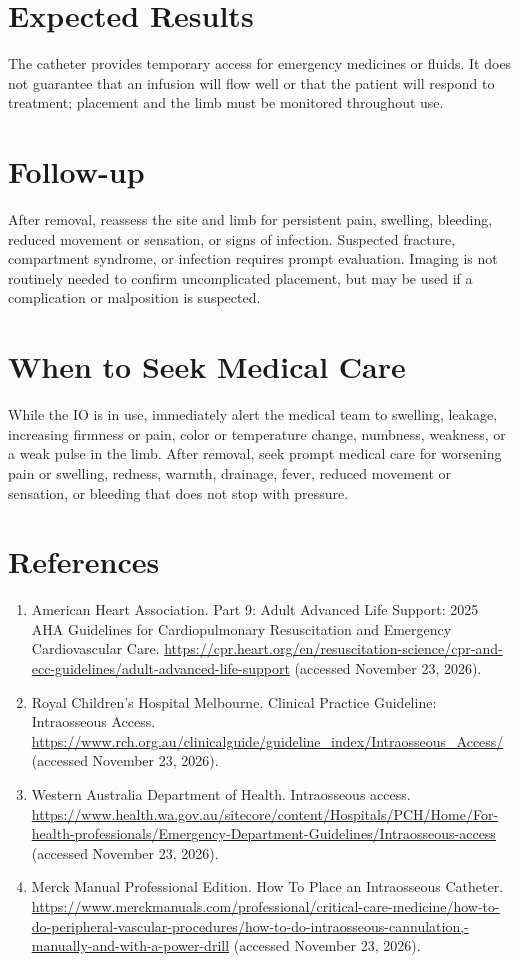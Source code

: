 \section*{Expected Results}
The catheter provides temporary access for emergency medicines or fluids. It does not guarantee that an infusion will flow well or that the patient will respond to treatment; placement and the limb must be monitored throughout use.

\section*{Follow-up}
After removal, reassess the site and limb for persistent pain, swelling, bleeding, reduced movement or sensation, or signs of infection. Suspected fracture, compartment syndrome, or infection requires prompt evaluation. Imaging is not routinely needed to confirm uncomplicated placement, but may be used if a complication or malposition is suspected.

\section*{When to Seek Medical Care}
While the IO is in use, immediately alert the medical team to swelling, leakage, increasing firmness or pain, color or temperature change, numbness, weakness, or a weak pulse in the limb. After removal, seek prompt medical care for worsening pain or swelling, redness, warmth, drainage, fever, reduced movement or sensation, or bleeding that does not stop with pressure.

\section*{References}
\begin{enumerate}
  \item American Heart Association. Part 9: Adult Advanced Life Support: 2025 AHA Guidelines for Cardiopulmonary Resuscitation and Emergency Cardiovascular Care. \url{https://cpr.heart.org/en/resuscitation-science/cpr-and-ecc-guidelines/adult-advanced-life-support} (accessed November 23, 2026).
  \item Royal Children's Hospital Melbourne. Clinical Practice Guideline: Intraosseous Access. \url{https://www.rch.org.au/clinicalguide/guideline_index/Intraosseous_Access/} (accessed November 23, 2026).
  \item Western Australia Department of Health. Intraosseous access. \url{https://www.health.wa.gov.au/sitecore/content/Hospitals/PCH/Home/For-health-professionals/Emergency-Department-Guidelines/Intraosseous-access} (accessed November 23, 2026).
  \item Merck Manual Professional Edition. How To Place an Intraosseous Catheter. \url{https://www.merckmanuals.com/professional/critical-care-medicine/how-to-do-peripheral-vascular-procedures/how-to-do-intraosseous-cannulation,-manually-and-with-a-power-drill} (accessed November 23, 2026).
\end{enumerate}

\clearpage

